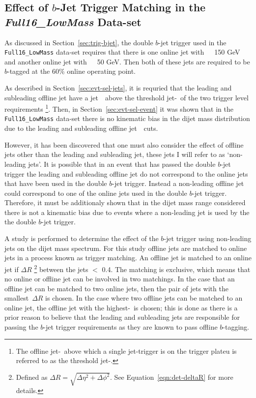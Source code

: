 \subsection{Effect of $b$-Jet Trigger Matching in the \textit{Full16\_LowMass} Data-set}
\label{sec:evt-sel_btrigMatch}

As discussed in Section~\ref{sec:trig-bjet},
the double $b$-jet trigger used in the \verb|Full16_LowMass| data-set
requires that there is one online jet with~\pT~\gt~150 GeV
and another online jet with~\pT~\gt~50 GeV.
Then both of these jets are required to be $b$-tagged at the 60\% online operating point.

As described in Section~\ref{sec:evt-sel-jets}, it is requried that the leading and subleading offline jet have a jet~\pT~above
the threshold jet-\pT~of the two trigger level requirements
\footnote{The offline jet-\pT~above which a single jet-trigger is on the trigger plateu is referred to as the threshold jet-\pT.}.
Then, in Section~\ref{sec:evt-sel-event} it was shown that in the \verb|Full16_LowMass| data-set
there is no kinematic bias in the dijet mass distribution due to the leading and subleading offline jet~\pT~cuts.

However, it has been discovered that one must also consider the effect of offline jets other than the leading and subleading jet,
these jets I will refer to as `non-leading jets'.
It is possible that in an event that has passed the double $b$-jet trigger the
leading and subleading offline jet do not correspond to the
online jets that have been used in the double $b$-jet trigger.
Instead a non-leading offline jet could correspond to one of the online jets used in the double $b$-jet trigger.
Therefore, it must be additionaly shown that in the dijet mass range considered there is not a kinematic bias
due to events where a non-leading jet is used by the the double $b$-jet trigger.

A study is performed to determine the effect of the $b$-jet trigger using non-leading jets on the dijet mass spectrum.
For this study offline jets are matched to online jets in a process known as trigger matching.
An offline jet is matched to an online jet if $\Delta R$
\footnote{Defined as $\Delta R = \sqrt{\Delta\eta^{2} + \Delta\phi^{2}}$. See Equation~\ref{eqn:det-deltaR} for more details.}
between the jets $<$ 0.4.
The matching is exclusive, which means that no online or offline jet can be involved in two matchings.
In the case that an offline jet can be matched to two online jets, then the pair of jets with the smallest~$\Delta R$ is chosen.
In the case where two offline jets can be matched to an online jet, the offline jet with the highest-\pT~is chosen;
this is done as there is a prior reason to believe that the leading and subleading jets are responsible
for passing the $b$-jet trigger requirements as they are known to pass offline $b$-tagging.

